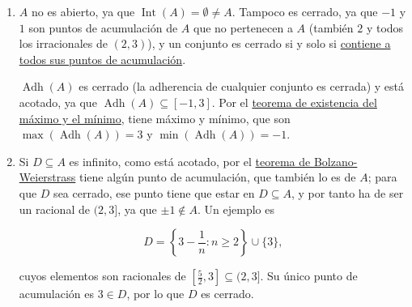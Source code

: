 \documentclass[
  spanish,
  a4paper,
]{scrreport}
\theoremstyle{definition}
\theoremstyle{remark}
\begin{document}
\begin{tcolorbox}
\begin{enumerate}
  Los puntos de \(B\) son de adherencia y frontera, pero no de
  acumulación, es decir, son \emph{puntos aislados} de \(A\): para
  \(x = (-1)^n\frac{n}{n+1}\in B\), basta tomar un \(\varepsilon\) menor
  que la distancia de \(x\) a los términos de \(B\) más próximos del
  mismo signo, \((-1)^n\frac{n-2}{n-1}\) (si \(n>2\)) y
  \((-1)^n\frac{n+2}{n+3}\), para que
  \((x-\varepsilon,x+\varepsilon)\cap A = \{x\}\).
\item
  \(A\) no es abierto, ya que
  \(\operatorname{Int}(A) = \emptyset \neq A\). Tampoco es cerrado, ya
  que \(-1\) y \(1\) son puntos de acumulación de \(A\) que no
  pertenecen a \(A\) (también \(2\) y todos los irracionales de
  \((2,3)\)), y un conjunto es cerrado si y solo si
  \href{https://aprendeconalf.es/analisis-manual/03-topologia-reales.html\#thm-conjunto-cerrado-puntos-acumulacion}{contiene
  a todos sus puntos de acumulación}.

  \(\operatorname{Adh}(A)\) es cerrado (la adherencia de cualquier
  conjunto es cerrada) y está acotado, ya que
  \(\operatorname{Adh}(A)\subseteq[-1,3]\). Por el
  \href{https://aprendeconalf.es/analisis-manual/03-topologia-reales.html\#thm-existencia-maximo-minimo}{teorema
  de existencia del máximo y el mínimo}, tiene máximo y mínimo, que son
  \(\max(\operatorname{Adh}(A)) = 3\) y
  \(\min(\operatorname{Adh}(A)) = -1\).
\item
  Si \(D\subseteq A\) es infinito, como está acotado, por el
  \href{https://aprendeconalf.es/analisis-manual/03-topologia-reales.html\#thm-bolzano-weierstrass}{teorema
  de Bolzano-Weierstrass} tiene algún punto de acumulación, que también
  lo es de \(A\); para que \(D\) sea cerrado, ese punto tiene que estar
  en \(D\subseteq A\), y por tanto ha de ser un racional de \((2,3]\),
  ya que \(\pm 1\not\in A\). Un ejemplo es

  \[
  D = \left\{3-\frac{1}{n} : n\geq 2\right\}\cup\{3\},
  \]

  cuyos elementos son racionales de
  \(\left[\frac{5}{2},3\right]\subseteq(2,3]\). Su único punto de
  acumulación es \(3\in D\), por lo que \(D\) es cerrado.
\end{enumerate}

\end{tcolorbox}
\end{document}
